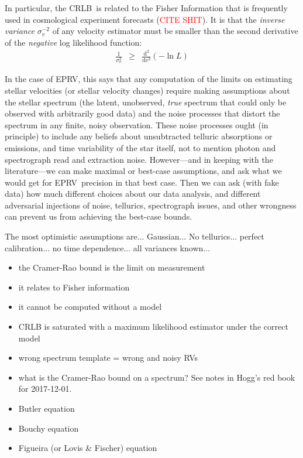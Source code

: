 \documentclass[modern]{aastex61}
\newcommand{\todo}[1]{\textcolor{red}{#1}}  %
\newcommand{\acronym}[1]{{\small{#1}}}
\newcommand{\RV}{\acronym{RV}}
\newcommand{\CRLB}{\acronym{CRLB}}
\newcommand{\EPRV}{\acronym{EPRV}}
\newcommand{\dd}{\mathrm{d}}
\begin{document}
In particular, the \CRLB\ is related to the Fisher Information that is
frequently used in cosmological experiment forecasts (\todo{CITE
  SHIT}).
It is that the \emph{inverse variance} $\sigma_v^{-2}$ of any velocity
estimator must be smaller than the second derivative of the
\emph{negative} log likelihood function:
\begin{eqnarray}
\frac{1}{\sigma_v^2} &\geq& \frac{\dd^2}{\dd v^2}(-\ln L)
\end{eqnarray}

In the case of \EPRV, this says that any computation of the limits
on estimating stellar velocities (or stellar velocity changes)
require making assumptions about the stellar spectrum (the
latent, unobserved, \emph{true} spectrum that could only be observed
with arbitrarily good data) and the noise processes that distort the
spectrum in any finite, noisy observation.
These noise processes ought (in principle) to include any beliefs about
unsubtracted telluric absorptions or emissions, and time variability
of the star itself, not to mention photon and spectrograph read and
extraction noise.
However---and in keeping with the literature---we can make maximal or
best-case assumptions, and ask what we would get for \EPRV\ precision
in that best case.
Then we can ask (with fake data) how much different choices about our
data analysis, and different adversarial injections of noise,
tellurics, spectrograph issues, and other wrongness can prevent us
from achieving the best-case bounds.

The most optimistic assumptions are... Gaussian... No
tellurics... perfect calibration... no time dependence... all
variances known...

\begin{itemize}
\item the Cramer-Rao bound is the limit on measurement
\item it relates to Fisher information
\item it cannot be computed without a model
\item CRLB is saturated with a maximum likelihood estimator under the correct model
\item wrong spectrum template = wrong and noisy \RV s
\end{itemize}

\begin{itemize}
\item what is the Cramer-Rao bound on a spectrum? See notes in Hogg's red book for 2017-12-01.
\item Butler equation
\item Bouchy equation
\item Figueira (or Lovis \& Fischer) equation
\end{itemize}
\end{document}
